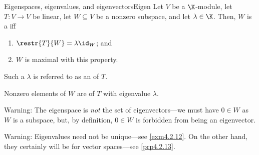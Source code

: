 \begin{dfn}{Eigenspaces, eigenvalues, and eigenvectors}{Eigen}
	Let $V$ be a $\K$-module, let $T\colon V\rightarrow V$ be linear, let $W\subseteq V$ be a nonzero subspace, and let $\lambda \in \K$.  Then, $W$ is a  iff
	\begin{enumerate}
		\item \label{Eigen(i)}$\restr{T}{W}=\lambda \id _W$; and
		\item \label{Eigen(ii)}$W$ is maximal with this property.
	\end{enumerate}
	\begin{rmk}
		Such a $\lambda$ is referred to as an  of $T$.
	\end{rmk}
	\begin{rmk}
		Nonzero elements of $W$ are  of $T$ with eigenvalue $\lambda$.
	\end{rmk}
	\begin{rmk}
		Warning:  The eigenspace is \emph{not} the set of eigenvectors---we must have $0\in W$ as $W$ is a subspace, but, by definition, $0\in W$ is forbidden from being an eigenvector.
	\end{rmk}
	\begin{rmk}
		Warning:  Eigenvalues need not be unique---see \cref{exm4.2.12}.  On the other hand, they certainly will be for vector spaces---see \cref{prp4.2.13}.
		

\end{rmk}
\end{dfn}
